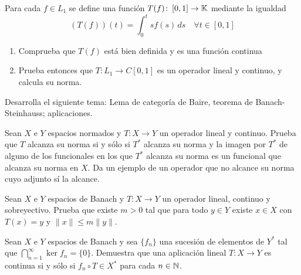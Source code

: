 \documentclass[12pt]{article}
\begin{document}
    \begin{ejercicio}
        Para cada $f \in L_1$ se define una función $T(f) \colon \left[0, 1\right] \to \mathbb{K}$ mediante la igualdad
        \[
            (T(f))(t) = \int_0^t s f(s) \, ds \quad \forall t \in \left[0, 1\right]
        \]
        \begin{enumerate}[label=\alph*)]
            \item Comprueba que $T(f)$ está bien definida y es una función continua
            \item Prueba entonces que $T \colon L_1 \to C\left[0, 1\right]$ es un operador lineal y continuo, y calcula su norma.
        \end{enumerate}
    \end{ejercicio}

    \begin{ejercicio}
        Desarrolla el siguiente tema: Lema de categoría de Baire, teorema de Banach-Steinhauss; aplicaciones.
    \end{ejercicio}

    \begin{ejercicio}[Extra]
        Sean $X$ e $Y$ espacios normados y $T \colon X \longrightarrow Y$ un operador lineal y continuo. Prueba que $T$ alcanza su norma si y sólo si $T^*$ alcanza su norma y la imagen por $T^*$ de alguno de los funcionales en los que $T^*$ alcanza su norma es un funcional que alcanza su norma en $X$. Da un ejemplo de un operador que no alcance su norma cuyo adjunto sí la alcance.
    \end{ejercicio}

    \newpage
    \setcounter{ejercicio}{0} %
    \noindent

    \begin{ejercicio}
        Sean $X$ e $Y$ espacios de Banach y $T \colon X \longrightarrow Y$ un operador lineal, continuo y sobreyectivo. Prueba que existe $m > 0$ tal que para todo $y \in Y$ existe $x \in X$ con $T(x) = y$ y $\|x\| \leqslant m \|y\|$.
    \end{ejercicio}

    \begin{ejercicio}
        Sean $X$ e $Y$ espacios de Banach y sea $\{f_n\}$ una sucesión de elementos de $Y^*$ tal que $\bigcap\limits_{n=1}^\infty \ker f_n = \{0\}$. Demuestra que una aplicación lineal $T \colon X \longrightarrow Y$ es continua si y sólo si $f_n \circ T \in X^*$ para cada $n \in \mathbb{N}$.
    \end{ejercicio}
\end{document}
